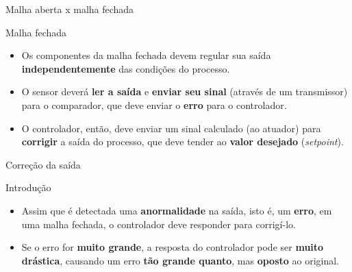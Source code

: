 \begin{frame}{Malha aberta x malha fechada}
	\begin{block}{Malha fechada}
		\begin{itemize}
			\item Os componentes da malha fechada devem regular sua saída \textbf{independentemente} das condições do processo.
			\item O sensor deverá \textbf{ler a saída} e \textbf{enviar seu sinal} (através de um transmissor) para o comparador, que deve enviar o \textbf{erro} para o controlador.
			\item O controlador, então, deve enviar um sinal calculado (ao atuador) para \textbf{corrigir} a saída do processo, que deve tender ao \textbf{valor desejado} (\textit{setpoint}).
		\end{itemize}
	\end{block}

	
	\centering
\end{frame}


\begin{frame}{Correção da saída}
	\begin{block}{Introdução}
		\begin{itemize}
			\item Assim que é detectada uma \textbf{anormalidade} na saída, isto é, um \textbf{erro}, em uma malha fechada, o controlador deve responder para corrigí-lo.
			\item Se o erro for \textbf{muito grande}, a resposta do controlador pode ser \textbf{muito drástica}, causando um erro \textbf{tão grande quanto}, mas \textbf{oposto} ao original.
		\end{itemize}
	\end{block}

	\vspace{-1.5cm}

	\centering
	\scalebox{0.8}{}
\end{frame}


